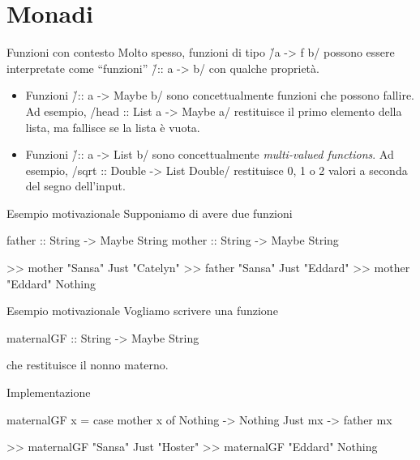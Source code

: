 \section*{Monadi}

\begin{frame}[fragile]{\secname}{Funzioni con contesto}
Molto spesso, funzioni di tipo \h/a -> f b/ possono essere interpretate come ``funzioni'' \h/:: a -> b/ con qualche proprietà.
\pause
\begin{itemize}[<+->]
\item Funzioni \h/:: a -> Maybe b/ sono concettualmente funzioni che possono fallire. Ad esempio,
\haskell/head :: List a -> Maybe a/
restituisce il primo elemento della lista, ma fallisce se la lista è vuota.
\item Funzioni \h/:: a -> List b/ sono concettualmente \emph{multi-valued functions}. Ad esempio,
\haskell/sqrt :: Double -> List Double/
restituisce 0, 1 o 2 valori a seconda del segno dell'input.
\end{itemize}
\end{frame}

\begin{frame}[fragile]{\secname}{Esempio motivazionale}
Supponiamo di avere due funzioni

\begin{haskellcode}
father :: String -> Maybe String
mother :: String -> Maybe String
\end{haskellcode}
\pause

\begin{runhaskell}
>>  mother "Sansa"
    Just "Catelyn"
>>  father "Sansa"
    Just "Eddard"
>>  mother "Eddard"
    Nothing
\end{runhaskell}
\end{frame}

\begin{frame}[fragile]{\secname}{Esempio motivazionale}
Vogliamo scrivere una funzione

\begin{haskellcode}
maternalGF :: String -> Maybe String
\end{haskellcode}

che restituisce il nonno materno.
\pause
\begin{block}{Implementazione}
\begin{haskellcode}
maternalGF x = case mother x of
    Nothing -> Nothing
    Just mx -> father mx
\end{haskellcode}
\end{block}
\pause

\begin{runhaskell}
>>  maternalGF "Sansa"
    Just "Hoster"
>>  maternalGF "Eddard"
    Nothing
\end{runhaskell}
\end{frame}


